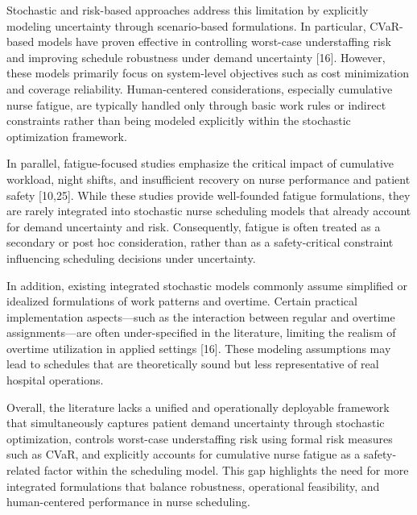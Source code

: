 \documentclass[10pt,a4paper,twocolumn]{article}
\begin{document}
Stochastic and risk-based approaches address this limitation by explicitly modeling uncertainty through scenario-based formulations. In particular, CVaR-based models have proven effective in controlling worst-case understaffing risk and improving schedule robustness under demand uncertainty [16]. However, these models primarily focus on system-level objectives such as cost minimization and coverage reliability. Human-centered considerations, especially cumulative nurse fatigue, are typically handled only through basic work rules or indirect constraints rather than being modeled explicitly within the stochastic optimization framework.

In parallel, fatigue-focused studies emphasize the critical impact of cumulative workload, night shifts, and insufficient recovery on nurse performance and patient safety [10,25]. While these studies provide well-founded fatigue formulations, they are rarely integrated into stochastic nurse scheduling models that already account for demand uncertainty and risk. Consequently, fatigue is often treated as a secondary or post hoc consideration, rather than as a safety-critical constraint influencing scheduling decisions under uncertainty.

In addition, existing integrated stochastic models commonly assume simplified or idealized formulations of work patterns and overtime. Certain practical implementation aspects—such as the interaction between regular and overtime assignments—are often under-specified in the literature, limiting the realism of overtime utilization in applied settings [16]. These modeling assumptions may lead to schedules that are theoretically sound but less representative of real hospital operations.

Overall, the literature lacks a unified and operationally deployable framework that simultaneously captures patient demand uncertainty through stochastic optimization, controls worst-case understaffing risk using formal risk measures such as CVaR, and explicitly accounts for cumulative nurse fatigue as a safety-related factor within the scheduling model. This gap highlights the need for more integrated formulations that balance robustness, operational feasibility, and human-centered performance in nurse scheduling.
\end{document}
